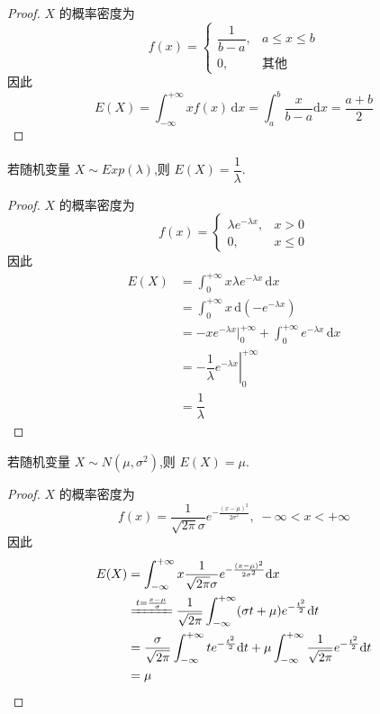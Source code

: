 \begin{proof}
    $X$ 的概率密度为
    $$
    f(x) = \begin{cases}
        \dfrac{1}{b-a}, & a \leqslant x \leqslant b \\[0.5em]
        0, & \text{其他}
    \end{cases}
    $$
    因此
    $$
    E(X) = \int_{-\infty}^{+\infty} x f(x) \, \text{d}x = \int_a^b \dfrac{x}{b-a} \text{d}x = \dfrac{a+b}{2}
    $$
\end{proof}

\begin{conclusion}
    \indent 若随机变量 $X \sim Exp(\lambda)$,则 $E(X) = \dfrac{1}{\lambda}$.
\end{conclusion}

\begin{proof}
    $X$ 的概率密度为
    $$
    f(x) = \begin{cases}
        \lambda e^{-\lambda x}, & x>0 \\
        0, & x \leqslant 0
    \end{cases}
    $$
    因此
    $$
    \begin{aligned}
        E(X) &= \int_0^{+\infty} x \lambda e^{-\lambda x} \, \text{d}x \\
        &= \int_0^{+\infty} x \, \text{d} (-e^{-\lambda x}) \\
        &= -xe^{-\lambda x} \Big|_0^{+\infty} + \int_0^{+\infty} e^{-\lambda x} \, \text{d}x \\
        &= \left. -\dfrac{1}{\lambda} e^{-\lambda x} \right|_0^{+\infty} \\
        &= \dfrac{1}{\lambda}
    \end{aligned}
    $$
\end{proof}

\begin{conclusion}
    \indent 若随机变量 $X \sim N(\mu,\sigma^2)$,则 $E(X) = \mu$.
\end{conclusion}

\begin{proof}
    $X$ 的概率密度为
    $$
    f(x) = \dfrac{1}{\sqrt{2 \pi} \sigma} e^{-\frac{(x-\mu)^2}{2 \sigma^2}}, \; -\infty < x < +\infty
    $$
    因此
    $$
    \begin{aligned}
        E(X) &= \int_{-\infty}^{+\infty} x \dfrac{1}{\sqrt{2 \pi} \sigma} e^{-\frac{(x-\mu)^2}{2 \sigma^2}} \text{d}x \\
        & \xlongequal{t = \frac{x-\mu}{\sigma}} \dfrac{1}{\sqrt{2 \pi}} \int_{-\infty}^{+\infty} (\sigma t + \mu) e^{-\frac{t^2}{2}} \text{d}t \\
        &= \dfrac{\sigma}{\sqrt{2 \pi}} \int_{-\infty}^{+\infty} te^{-\frac{t^2}{2}} \text{d}t + \mu \int_{-\infty}^{+\infty} \dfrac{1}{\sqrt{2 \pi}} e^{-\frac{t^2}{2}} \text{d}t \\
        &= \mu
    \end{aligned}
    $$
\end{proof}

